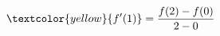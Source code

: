 \documentclass[preview]{standalone}
\begin{document}
\begin{align*}
\textcolor{yellow}{f'(1)} = \dfrac{f(2) - f(0)}{2 - 0}
\end{align*}
\end{document}
